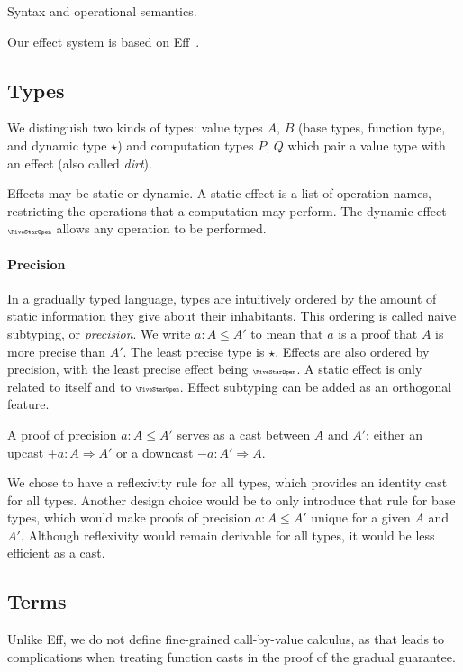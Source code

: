Syntax and operational semantics.

Our effect system is based on Eff~\cite{bauer2015programming}.

\subsection{Types}

We distinguish two kinds of types: value types $A$, $B$ (base types, function type, and
dynamic type $\star$) and computation types $P$, $Q$ which pair a value type with an effect (also called \emph{dirt}).

Effects may be static or dynamic. A static effect is a list of operation names,
restricting the operations that a computation may perform. The dynamic effect $\effany$
allows any operation to be performed.

\paragraph{Precision}
In a gradually typed language, types are intuitively ordered by the amount of
static information they give about their inhabitants. This ordering is called
naive subtyping, or \emph{precision}.
We write $a : A \le A'$ to mean that $a$ is a proof that $A$ is more precise than $A'$.
The least precise type is $\star$.
Effects are also ordered by precision, with the least precise effect being $\effany$.
A static effect is only related to itself and to $\effany$.
Effect subtyping can be added as an orthogonal feature.

A proof of precision $a : A \le A'$ serves as a cast between $A$ and $A'$:
either an upcast $+a : A \Rightarrow A'$ or a downcast $-a : A' \Rightarrow A$.

We chose to have a reflexivity rule for all types, which provides an
identity cast for all types. Another design choice would be to only introduce
that rule for base types, which would make proofs of precision $a : A \le A'$
unique for a given $A$ and $A'$. Although reflexivity would remain derivable
for all types, it would be less efficient as a cast.

\subsection{Terms}

Unlike Eff, we do not define fine-grained call-by-value calculus, as that leads
to complications when treating function casts in the proof of the gradual guarantee.


